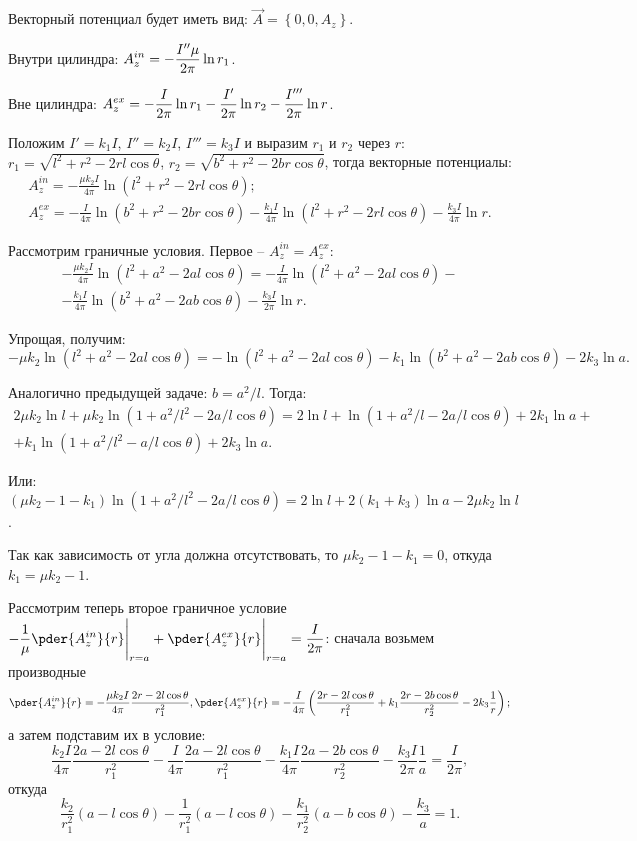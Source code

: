 Векторный потенциал будет иметь вид: \( \vec{A} = \left\{0, 0, A_z\right\} \).

Внутри цилиндра: \( \displaystyle A_z^{in} = -\frac{I''\mu}{2\pi}\ln r_1 \).

Вне цилиндра: \( \displaystyle A_z^{ex} = -\frac{I}{2\pi}\ln r_1 - \frac{I'}{2\pi}\ln r_2
- \frac{I'''}{2\pi}\ln r \).

Положим \( I' = k_1I \), \( I'' = k_2I \), \( I''' = k_3I \) и выразим
\( r_1 \) и \( r_2 \) через \( r \):\\ 
\( r_1 = \sqrt{l^2 + r^2 - 2rl\cos\theta} \),
\( r_2 = \sqrt{b^2 + r^2 - 2br\cos\theta} \), тогда векторные потенциалы:
\begin{gather*}
    A_z^{in} = -\frac{\mu k_2I}{4\pi}\ln(l^2 + r^2 - 2rl\cos\theta);\\
    A_z^{ex} = -\frac{I}{4\pi}\ln(b^2 + r^2 - 2br\cos\theta) -
    \frac{k_1I}{4\pi}\ln(l^2 + r^2 - 2rl\cos\theta) - \frac{k_3I}{4\pi}\ln r.
\end{gather*}

Рассмотрим граничные условия. Первое -- \( A_z^{in} = A_z^{ex} \):
\begin{gather*}
    -\frac{\mu k_2I}{4\pi}\ln(l^2 + a^2 - 2al\cos\theta) = -\frac{I}{4\pi}
    \ln(l^2 + a^2 - 2al\cos\theta) - \\ - \frac{k_1I}{4\pi}
    \ln(b^2 + a^2 - 2ab\cos\theta) - \frac{k_3I}{2\pi}\ln r.
\end{gather*}

Упрощая, получим:
\[
    -\mu k_2\ln(l^2 + a^2 - 2al\cos\theta) = -\ln(l^2 + a^2 - 2al\cos\theta) -
    k_1\ln(b^2 + a^2 -2ab\cos\theta) - 2k_3\ln a.
\]

Аналогично предыдущей задаче: \( b = a^2/l \). Тогда:
\begin{gather*}
    2\mu k_2\ln l + \mu k_2\ln(1 + a^2/l^2 - 2a/l\cos\theta) = 2\ln l +
    \ln(1 + a^2/l - 2a/l\cos\theta) + 2k_1\ln a + \\ +
    k_1\ln(1 + a^2/l^2 - a/l\cos\theta) + 2k_3\ln a.
\end{gather*}

Или: \( (\mu k_2 - 1 - k_1)\ln(1 + a^2/l^2 - 2a/l\cos\theta) = 2\ln l +
2(k_1 + k_3)\ln a - 2\mu k_2\ln l \).

Так как зависимость от угла должна отсутствовать, то \( \mu k_2 - 1 - k_1 = 0
\), откуда \( k_1 = \mu k_2 - 1 \).

Рассмотрим теперь второе граничное условие \( \ds -\frac{1}{\mu}
\pder{A_z^{in}}{r}\Biggr|_{r = a} + \pder{A_z^{ex}}{r}\Biggr|_{r = a} =
\frac{I}{2\pi} \): сначала возьмем производные
\[
    \pder{A_z^{in}}{r} = -\frac{\mu k_2I}{4\pi}\frac{2r - 2l\cos\theta}{r_1^2},
    \pder{A_z^{ex}}{r} = -\frac{I}{4\pi}\left(\frac{2r - 2l\cos\theta}{r_1^2}
    + k_1\frac{2r - 2b\cos\theta}{r_2^2} - 2k_3\frac{1}{r}\right);
\]
а затем подставим их в условие:
\[
    \frac{k_2I}{4\pi}\frac{2a - 2l\cos\theta}{r_1^2} - \frac{I}{4\pi}
    \frac{2a - 2l\cos\theta}{r_1^2} - \frac{k_1I}{4\pi}\frac{2a - 2b\cos\theta}
    {r_2^2} - \frac{k_3I}{2\pi}\frac{1}{a} = \frac{I}{2\pi},
\]
откуда
\[
    \frac{k_2}{r_1^2}(a - l\cos\theta) - \frac{1}{r_1^2}(a - l\cos\theta) -
    \frac{k_1}{r_2^2}(a - b\cos\theta) - \frac{k_3}{a} = 1.
\]

